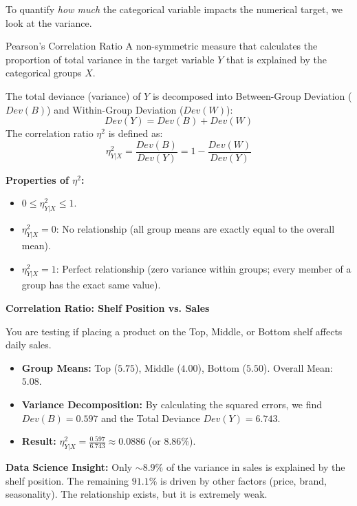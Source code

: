 To quantify \textit{how much} the categorical variable impacts the numerical target, we look at the variance.



\begin{defbox}{Pearson's Correlation Ratio}
A non-symmetric measure that calculates the proportion of total variance in the target variable $Y$ that is explained by the categorical groups $X$. 

The total deviance (variance) of $Y$ is decomposed into Between-Group Deviation ($Dev(B)$) and Within-Group Deviation ($Dev(W)$):
\begin{equation}
    Dev(Y) = Dev(B) + Dev(W)
\end{equation}
The correlation ratio $\eta^2$ is defined as:
\begin{equation}
    \eta_{Y|X}^2 = \frac{Dev(B)}{Dev(Y)} = 1 - \frac{Dev(W)}{Dev(Y)}
\end{equation}
\end{defbox}

\textbf{Properties of $\eta^2$:}
\begin{itemize}
    \item $0 \leq \eta_{Y|X}^2 \leq 1$.
    \item $\eta_{Y|X}^2 = 0$: No relationship (all group means are exactly equal to the overall mean).
    \item $\eta_{Y|X}^2 = 1$: Perfect relationship (zero variance within groups; every member of a group has the exact same value).
\end{itemize}

\vspace{0.2cm}
\begin{example}{\textbf{Correlation Ratio: Shelf Position vs. Sales}}

You are testing if placing a product on the Top, Middle, or Bottom shelf affects daily sales. 
\begin{itemize}
    \item \textbf{Group Means:} Top ($5.75$), Middle ($4.00$), Bottom ($5.50$). Overall Mean: $5.08$.
    \item \textbf{Variance Decomposition:} By calculating the squared errors, we find $Dev(B) = 0.597$ and the Total Deviance $Dev(Y) = 6.743$.
    \item \textbf{Result:} $\eta_{Y|X}^2 = \frac{0.597}{6.743} \approx 0.0886$ (or $8.86\%$).
\end{itemize}
\textbf{Data Science Insight:} Only $\sim8.9\%$ of the variance in sales is explained by the shelf position. The remaining $91.1\%$ is driven by other factors (price, brand, seasonality). The relationship exists, but it is extremely weak.
\end{example}

